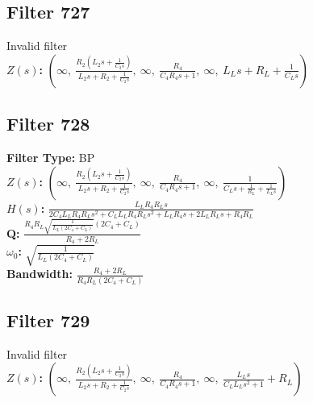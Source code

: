 \documentclass{article}
\begin{document}
\subsection*{Filter 727}
Invalid filter \\ 
\textbf{$Z(s)$:} $\left( \infty, \  \frac{R_{2} \left(L_{2} s + \frac{1}{C_{2} s}\right)}{L_{2} s + R_{2} + \frac{1}{C_{2} s}}, \  \infty, \  \frac{R_{4}}{C_{4} R_{4} s + 1}, \  \infty, \  L_{L} s + R_{L} + \frac{1}{C_{L} s}\right)$ \\ 
\subsection*{Filter 728}
\textbf{Filter Type:} BP \\ 
\textbf{$Z(s)$:} $\left( \infty, \  \frac{R_{2} \left(L_{2} s + \frac{1}{C_{2} s}\right)}{L_{2} s + R_{2} + \frac{1}{C_{2} s}}, \  \infty, \  \frac{R_{4}}{C_{4} R_{4} s + 1}, \  \infty, \  \frac{1}{C_{L} s + \frac{1}{R_{L}} + \frac{1}{L_{L} s}}\right)$ \\ 
\textbf{$H(s)$:} $\frac{L_{L} R_{4} R_{L} s}{2 C_{4} L_{L} R_{4} R_{L} s^{2} + C_{L} L_{L} R_{4} R_{L} s^{2} + L_{L} R_{4} s + 2 L_{L} R_{L} s + R_{4} R_{L}}$ \\ 
\textbf{Q:} $\frac{R_{4} R_{L} \sqrt{\frac{1}{L_{L} \left(2 C_{4} + C_{L}\right)}} \left(2 C_{4} + C_{L}\right)}{R_{4} + 2 R_{L}}$ \\ 
\textbf{$\omega_0$:} $\sqrt{\frac{1}{L_{L} \left(2 C_{4} + C_{L}\right)}}$ \\ 
\textbf{Bandwidth:} $\frac{R_{4} + 2 R_{L}}{R_{4} R_{L} \left(2 C_{4} + C_{L}\right)}$ \\ 
\subsection*{Filter 729}
Invalid filter \\ 
\textbf{$Z(s)$:} $\left( \infty, \  \frac{R_{2} \left(L_{2} s + \frac{1}{C_{2} s}\right)}{L_{2} s + R_{2} + \frac{1}{C_{2} s}}, \  \infty, \  \frac{R_{4}}{C_{4} R_{4} s + 1}, \  \infty, \  \frac{L_{L} s}{C_{L} L_{L} s^{2} + 1} + R_{L}\right)$ \\ 
\end{document}
